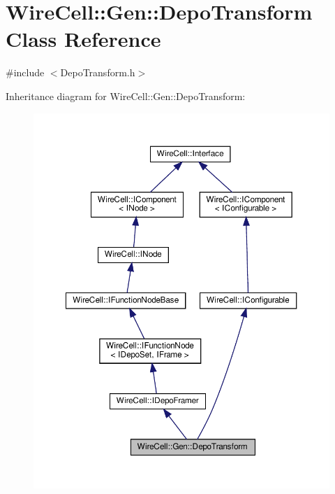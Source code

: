 \hypertarget{class_wire_cell_1_1_gen_1_1_depo_transform}{}\section{Wire\+Cell\+:\+:Gen\+:\+:Depo\+Transform Class Reference}
\label{class_wire_cell_1_1_gen_1_1_depo_transform}


{\ttfamily \#include $<$Depo\+Transform.\+h$>$}



Inheritance diagram for Wire\+Cell\+:\+:Gen\+:\+:Depo\+Transform\+:
\nopagebreak
\begin{figure}[H]
\begin{center}
\leavevmode
\includegraphics[width=350pt]{class_wire_cell_1_1_gen_1_1_depo_transform__inherit__graph}
\end{center}
\end{figure}


